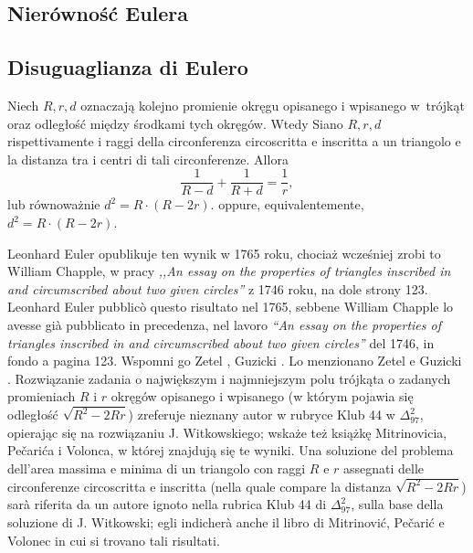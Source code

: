 %

\subsection{Nierówność Eulera} %
\subsection{Disuguaglianza di Eulero} %

\begin{proposition}
[nierówność Eulera] %
[disuguaglianza di Eulero] %
	Niech $R, r, d$ oznaczają kolejno promienie okręgu opisanego i wpisanego w~trójkąt oraz odległość między środkami tych okręgów. %
	Wtedy %
	Siano $R, r, d$ rispettivamente i raggi della circonferenza circoscritta e inscritta a un triangolo e la distanza tra i centri di tali circonferenze. %
	Allora %
	\begin{equation}
		\frac{1}{R-d} + \frac{1}{R+d} = \frac 1 r,
	\end{equation}
	lub równoważnie $d^2 = R \cdot (R - 2r)$. %
	oppure, equivalentemente, $d^2 = R \cdot (R - 2r)$. %
\end{proposition}

Leonhard Euler opublikuje ten wynik w 1765 roku, chociaż wcześniej zrobi to William Chapple, w pracy \emph{,,An essay on the properties of triangles inscribed in and circumscribed about two given circles''} z 1746 roku, na dole strony 123. %
Leonhard Euler pubblicò questo risultato nel 1765, sebbene William Chapple lo avesse già pubblicato in precedenza, nel lavoro \emph{``An essay on the properties of triangles inscribed in and circumscribed about two given circles''} del 1746, in fondo a pagina 123. %
Wspomni go Zetel \cite[s. 75]{zetel_2020}, Guzicki \cite[s. 362, 368-370]{guzicki_2021}. %
Lo menzionano Zetel \cite[p. 75]{zetel_2020} e Guzicki \cite[pp. 362, 368-370]{guzicki_2021}. %
Rozwiązanie zadania o największym i najmniejszym polu trójkąta o zadanych promieniach $R$ i $r$ okręgów opisanego i wpisanego (w którym pojawia się odległość $\sqrt{R^2 - 2Rr}$) zreferuje nieznany autor w rubryce Klub 44 w $\Delta_{97}^2$, opierając się na rozwiązaniu J. Witkowskiego; wskaże też książkę Mitrinovicia, Pečarića i Volonca, w której znajdują się te wyniki. %
Una soluzione del problema dell'area massima e minima di un triangolo con raggi $R$ e $r$ assegnati delle circonferenze circoscritta e inscritta (nella quale compare la distanza $\sqrt{R^2 - 2Rr}$) sarà riferita da un autore ignoto nella rubrica Klub 44 di $\Delta_{97}^2$, sulla base della soluzione di J. Witkowski; egli indicherà anche il libro di Mitrinović, Pečarić e Volonec in cui si trovano tali risultati. %

